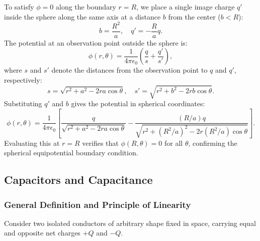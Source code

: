 To satisfy \(\phi = 0\) along the boundary \(r = R\), we place a single image charge \(q'\) inside the sphere along the same axis at a distance \(b\) from the center (\(b < R\)):
\begin{equation}
    b = \frac{R^2}{a}, \quad q' = -\frac{R}{a}q.
\end{equation}
The potential at an observation point outside the sphere is:
\begin{equation}
    \phi(r, \theta) = \frac{1}{4\pi\epsilon_0} \left( \frac{q}{s} + \frac{q'}{s'} \right),
\end{equation}
where \(s\) and \(s'\) denote the distances from the observation point to \(q\) and \(q'\), respectively:
\begin{equation}
    s = \sqrt{r^2 + a^2 - 2ra\cos\theta}, \quad s' = \sqrt{r^2 + b^2 - 2rb\cos\theta}.
\end{equation}
Substituting \(q'\) and \(b\) gives the potential in spherical coordinates:
\begin{equation}
    \phi(r, \theta) = \frac{1}{4\pi\epsilon_0} \left[ \frac{q}{\sqrt{r^2 + a^2 - 2ra\cos\theta}} - \frac{(R/a)q}{\sqrt{r^2 + (R^2/a)^2 - 2r(R^2/a)\cos\theta}} \right].
\end{equation}
Evaluating this at \(r = R\) verifies that \(\phi(R, \theta) = 0\) for all \(\theta\), confirming the spherical equipotential boundary condition.

\subsection{Capacitors and Capacitance}

\subsubsection{General Definition and Principle of Linearity}

Consider two isolated conductors of arbitrary shape fixed in space, carrying equal and opposite net charges \(+Q\) and \(-Q\).

